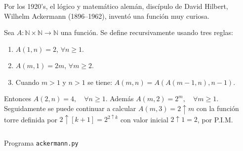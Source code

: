 \begin{frame}
\frametitle{\subsubsecname}

Por los 1920's, el lógico y matemático alemán, discípulo de David Hilbert, Wilhelm Ackermann (1896–1962), inventó una función muy curiosa.

\begin{minipage}{0.45\paperwidth}
	\begin{definition}[Ackermann]
		Sea $A\colon\mathds{N}\times\mathds{N}\rightarrow\mathds{N}$ una función. Se define recursivamente usando tres reglas:
		\begin{enumerate}
			\item $A(1,n)=2$, $\forall n\geq 1$.
			\item $A(m,1)=2m$, $\forall m\geq 2$.
			\item Cuando $m>1$ y $n>1$ se tiene: $A\left(m,n\right)=A\left(A(m-1,n),n-1\right)$.
		\end{enumerate}
	\end{definition}
	\begin{remark}
		Entonces $A\left(2,n\right)=4,\quad\forall n\geq1$. Además $A\left(m,2\right)=2^{m},\quad\forall m\geq 1$. Seguidamente se puede continuar a calcular $A\left(m,3\right)=2\uparrow m$ con la función torre definida por $2\uparrow\left[k+1\right]=2^{2\uparrow k}$ con valor inicial $2\uparrow 1=2$, por P.I.M.
	\end{remark}
\end{minipage}
\hfill
\begin{minipage}{0.45\paperwidth}
	\begin{listing}[H]
		\inputminted{python}{./code/ackermann.py}
		\caption{Programa \texttt{ackermann.py}}
	\end{listing}
\end{minipage}

\end{frame}